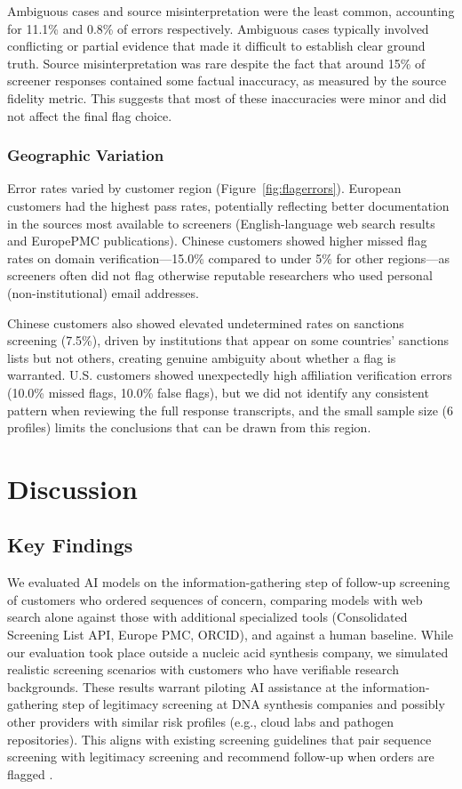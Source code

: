 \documentclass[utf8]{FrontiersinHarvard}
\begin{document}
Ambiguous cases and source misinterpretation were the least common, accounting for 11.1\% and 0.8\% of errors respectively. Ambiguous cases typically involved conflicting or partial evidence that made it difficult to establish clear ground truth. Source misinterpretation was rare despite the fact that around 15\% of screener responses contained some factual inaccuracy, as measured by the source fidelity metric. This suggests that most of these inaccuracies were minor and did not affect the final flag choice.

\subsubsection{Geographic Variation}

Error rates varied by customer region (Figure~\ref{fig:flagerrors}). European customers had the highest pass rates, potentially reflecting better documentation in the sources most available to screeners (English-language web search results and EuropePMC publications). Chinese customers showed higher missed flag rates on domain verification—15.0\% compared to under 5\% for other regions—as screeners often did not flag otherwise reputable researchers who used personal (non-institutional) email addresses.

Chinese customers also showed elevated undetermined rates on sanctions screening (7.5\%), driven by institutions that appear on some countries' sanctions lists but not others, creating genuine ambiguity about whether a flag is warranted. U.S. customers showed unexpectedly high affiliation verification errors (10.0\% missed flags, 10.0\% false flags), but we did not identify any consistent pattern when reviewing the full response transcripts, and the small sample size (6 profiles) limits the conclusions that can be drawn from this region.

\section{Discussion}

\subsection{Key Findings}

We evaluated AI models on the information-gathering step of follow-up screening of customers who ordered sequences of concern, comparing models with web search alone against those with additional specialized tools (Consolidated Screening List API, Europe PMC, ORCID), and against a human baseline. While our evaluation took place outside a nucleic acid synthesis company, we simulated realistic screening scenarios with customers who have verifiable research backgrounds. These results warrant piloting AI assistance at the information-gathering step of legitimacy screening at DNA synthesis companies and possibly other providers with similar risk profiles (e.g., cloud labs and pathogen repositories). This aligns with existing screening guidelines that pair sequence screening with legitimacy screening and recommend follow-up when orders are flagged \citep{HHS2023, IGSC2024}.
\end{document}
